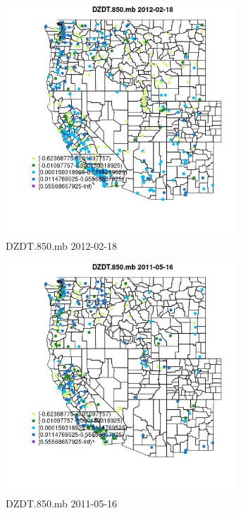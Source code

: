 \begin{figure} 
\centering  
\includegraphics[width=0.77\textwidth]{Code_Outputs/Report_ML_input_PM25_Step4_part_f_de_duplicated_aves_prioritize_24hr_obswNAs_MapObsDZDT850mb2012-02-18.jpg} 
\caption{\label{fig:Report_ML_input_PM25_Step4_part_f_de_duplicated_aves_prioritize_24hr_obswNAsMapObsDZDT850mb2012-02-18}DZDT.850.mb 2012-02-18} 
\end{figure} 
 

\clearpage 

\begin{figure} 
\centering  
\includegraphics[width=0.77\textwidth]{Code_Outputs/Report_ML_input_PM25_Step4_part_f_de_duplicated_aves_prioritize_24hr_obswNAs_MapObsDZDT850mb2011-05-16.jpg} 
\caption{\label{fig:Report_ML_input_PM25_Step4_part_f_de_duplicated_aves_prioritize_24hr_obswNAsMapObsDZDT850mb2011-05-16}DZDT.850.mb 2011-05-16} 
\end{figure} 
 

